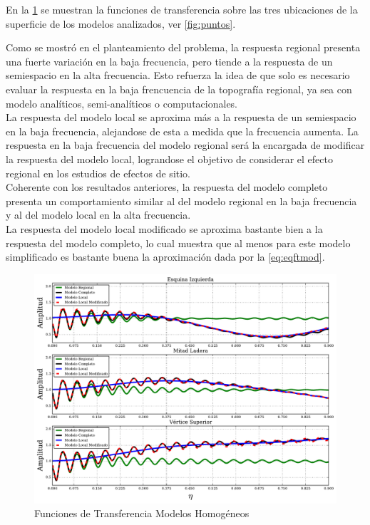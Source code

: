 \documentclass[spanish,letterpaper,12pt,twoside,openany]{article}
\begin{document}
En la \cref{fig:tfhom} se muestran la funciones de transferencia sobre las tres ubicaciones de la superficie de los modelos analizados, ver \cref{fig:puntos}. 

Como se mostró en el planteamiento del problema, la respuesta regional presenta una fuerte variación en la baja frecuencia, pero tiende a la respuesta de un semiespacio en la alta frecuencia. Esto refuerza la idea de que solo es necesario evaluar la respuesta en la baja frencuencia de la topografía regional, ya sea con modelo analíticos, semi-analíticos o computacionales.\\
%
La respuesta del modelo local se aproxima más a la respuesta de un semiespacio en la baja frecuencia, alejandose de esta a medida que la frecuencia aumenta. La respuesta en la baja frecuencia del modelo regional será la encargada de modificar la respuesta del modelo local, lograndose el objetivo de considerar el efecto regional en los estudios de efectos de sitio.\\
%
Coherente con los resultados anteriores, la respuesta del modelo completo presenta un comportamiento similar al del modelo regional en la baja frecuencia y al del modelo local en la alta frecuencia.\\
%
La respuesta del modelo local modificado se aproxima bastante bien a la respuesta del modelo completo, lo cual muestra que al menos para este modelo simplificado es bastante buena la aproximación dada por la \cref{eq:eqftmod}.

\begin{figure}[H]
	\centering
	\includegraphics[width=15 cm]{img/TransFuncHom.pdf}
	\vspace{-.5 cm}
	\caption{Funciones de Transferencia Modelos Homogéneos}
	\label{fig:tfhom}
	\vspace{-1 cm}
\end{figure}
%
%
%
%
%
\end{document}
